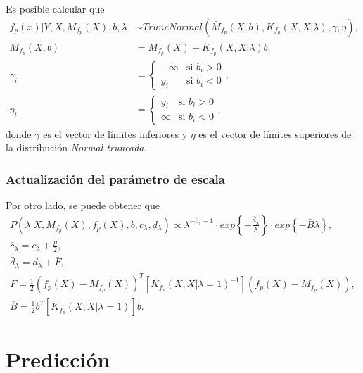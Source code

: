 Es posible calcular que
\begin{equation*}
\begin{aligned}
   f_p(x)|Y,X,M_{f_p}(X),b,\lambda &\sim TruncNormal(\bar{M}_{f_p}(X,b), K_{f_p}(X,X|\lambda), \gamma, \eta), \\
   \bar{M}_{f_p}(X,b) &= M_{f_p}(X) + K_{f_p}(X,X|\lambda)b, \\
   \gamma_i &= 
   \begin{cases}
    -\infty & \text{si }b_i > 0 \\
    y_i & \text{si }b_i < 0
   \end{cases},\\
   \eta_i &= 
   \begin{cases}
    y_i & \text{si }b_i > 0 \\
    \infty & \text{si }b_i < 0
   \end{cases},
\end{aligned}
\end{equation*}
donde $\gamma$ es el vector de l\'imites inferiores y $\eta$ es el vector de l\'imites superiores de la distribuci\'on \textit{Normal truncada}.

\subsubsection{Actualizaci\'on del par\'ametro de escala}

Por otro lado, se puede obtener que
\begin{equation*}
\begin{gathered}
   P(\lambda|X,M_{f_p}(X),f_p(X),b,c_\lambda,d_\lambda) 
   \propto
   \lambda^{-\bar{c}_\lambda-1}
   \cdot
   exp\left\{- \frac{\bar{d}_\lambda}{\lambda}\right\}
   \cdot
   exp\left\{-\bar{B} \lambda\right\}, \\
   \bar{c}_\lambda = c_\lambda + \frac{p}{2}, \\
   \bar{d}_\lambda = d_\lambda + \bar{F}, \\
   \bar{F} = \frac{1}{2}(f_p(X)-M_{f_p}(X))^T [K_{f_p}(X,X|\lambda=1)^{-1}] (f_p(X)-M_{f_p}(X)), \\
   \bar{B} = \frac{1}{2}b^T [K_{f_p}(X,X|\lambda=1)] b.
\end{gathered}
\end{equation*}

\section{Predicci\'on}

